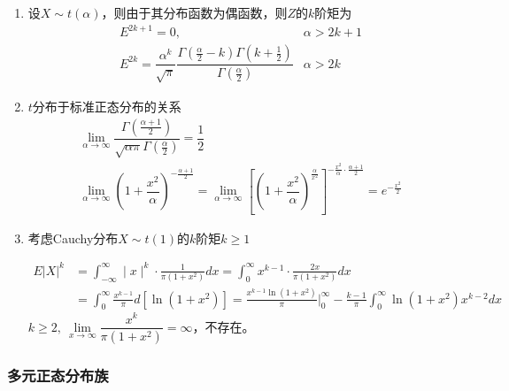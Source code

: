\begin{note}
    \begin{enumerate}[label=\arabic*\textsuperscript{$\circ$}]
        \item 设$X\sim t(\alpha)$，则由于其分布函数为偶函数，则$Z$的$k$阶矩为
        \[
            \begin{array}{lr}
                E^{2k+1} = 0,& \alpha>2k+1\\
                E^{2k} = \dfrac{\alpha^k}{\sqrt{\pi}}\dfrac{\Gamma{(\frac{\alpha}{2}-k)}\Gamma(k+\frac{1}{2})}{\Gamma(\frac{\alpha}{2})}    & \alpha>2k
            \end{array}
        \]
        \item $t$分布于标准正态分布的关系
        \[
            \begin{array}{l}
                \lim\limits_{\alpha\rightarrow \infty} \dfrac{\Gamma(\frac{\alpha+1}{2})}{\sqrt{\alpha \pi}\Gamma(\frac{\alpha}{2})} = \dfrac{1}{2}\\
                \lim\limits_{\alpha\rightarrow \infty} (1+\dfrac{x^2}{\alpha})^{-\frac{\alpha+1}{2}} = \lim\limits_{\alpha\rightarrow \infty} [(1+\dfrac{x^2}{\alpha})^{\frac{\alpha}{x^2}}]^{-\frac{x^2}{\alpha}\cdot\frac{\alpha+1}{2}}=e^{-\frac{x^2}{2}}
            \end{array}
        \] 
        \item 考虑Cauchy分布$X\sim t(1)$的$k$阶矩$k\geqslant1$

        \[
            \begin{aligned}
                E\left|X\right|^{k}& =\int_{-\infty}^{\infty}\mid x\mid^{k}\cdot\frac{1}{\pi(1+x^{2})}dx=\int_{0}^{\infty}x^{k-1}\cdot\frac{2x}{\pi(1+x^{2})}dx  \\
                &=\int_{0}^{\infty}\frac{x^{k-1}}{\pi}d[\ln(1+x^{2})]=\frac{x^{k-1}\ln(1+x^{2})}{\pi}\Bigg|_{0}^{\infty}-\frac{k-1}{\pi}\int_{0}^{\infty}\ln(1+x^{2})x^{k-2}dx
                \end{aligned}
        \]
        $k\geqslant 2,\ \lim\limits_{x\rightarrow \infty}\dfrac{x^k}{\pi(1+x^2)}=\infty$，不存在。
    \end{enumerate}
\end{note}

\subsubsection{多元正态分布族}

